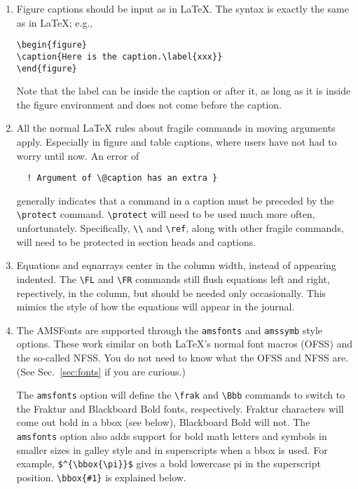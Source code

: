 \begin{enumerate}
\item Figure captions should be input as in \LaTeX{}.
The syntax is exactly the same as in \LaTeX{}; e.g.,
\begin{verbatim}
\begin{figure}
\caption{Here is the caption.\label{xxx}}
\end{figure}
\end{verbatim}
Note that the label can be inside the caption or after it, as long as it is
inside the figure environment and does not come before the caption.

\item All the normal \LaTeX{} rules about fragile commands in moving
arguments apply. Especially in figure and table captions, where \REVTeX{}
users have not had to worry until now. An error of
\begin{verbatim}
  ! Argument of \@caption has an extra }
\end{verbatim}
generally indicates that a command in a caption must be preceded by
the \verb+\protect+ command.
\verb+\protect+ will need to be used much more often, unfortunately.
Specifically, \verb+\\+ and \verb+\ref+, along with other fragile commands,
will need to be protected in section heads and captions.

\item Equations and eqnarrays center in the column width, instead of
appearing indented. The \verb+\FL+ and \verb+\FR+ commands still flush
equations left and right, repectively, in the column, but should be needed
only occasionally. This mimics the style of how the equations will appear in the journal.

\item The AMSFonts are supported through the \verb+amsfonts+ and
\verb+amssymb+ style options.  These work similar on both \LaTeX's normal
font macros (OFSS) and the so-called NFSS. You do not need to know what the
OFSS and NFSS are. (See Sec.\ \ref{sec:fonts} if you are curious.)

The \verb+amsfonts+ option will define the \verb+\frak+ and \verb+\Bbb+
commands to switch to the Fraktur and Blackboard Bold fonts, respectively.
Fraktur characters will come out bold in a bbox (see below), Blackboard
Bold will not. The \verb+amsfonts+ option also adds support for bold math
letters and symbols in smaller sizes in galley style and in superscripts
when a bbox is used.  For example, \verb+$^{\bbox{\pi}}$+ gives a bold
lowercase pi in the superscript position. \verb+\bbox{#1}+ is explained
below.


\end{enumerate}
